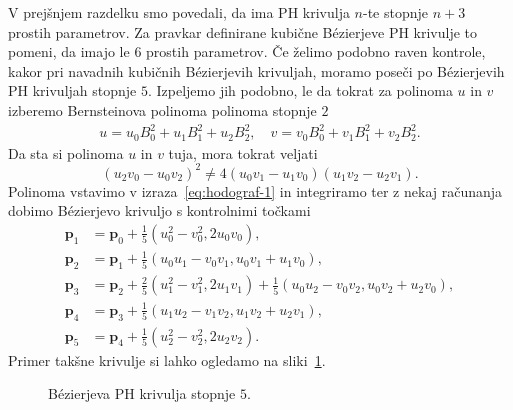 \documentclass[isrm2, tisk]{fmfdelo}
\newcommand{\p}{\mathbf{p}}
\begin{document}
    V prejšnjem razdelku smo povedali, da ima PH krivulja $n$-te stopnje $n+3$ prostih parametrov.
    Za pravkar definirane kubične Bézierjeve PH krivulje to pomeni, da imajo le $6$ prostih parametrov.
    Če želimo podobno raven kontrole, kakor pri navadnih kubičnih Bézierjevih krivuljah, moramo poseči po Bézierjevih PH krivuljah stopnje $5$.
    Izpeljemo jih podobno, le da tokrat za polinoma $u$ in $v$  izberemo Bernsteinova polinoma polinoma stopnje $2$
    \begin{align}
        \label{eq:ph-bernstein-2}
        u=u_0B_{0}^{2}+u_1B_{1}^{2}+u_2B_{2}^{2}, \quad v=v_0B_{0}^{2}+v_1B_{1}^{2}+v_2B_{2}^{2}.
    \end{align}
    Da sta si polinoma $u$ in $v$ tuja, mora tokrat veljati \[(u_2 v_0 -u_0 v_2)^2 \neq 4(u_0 v_1 - u_1 v_0)(u_1 v_2-u_2v_1).\]
    Polinoma vstavimo v izraza~\eqref{eq:hodograf-1} in integriramo ter z nekaj računanja dobimo Bézierjevo krivuljo s kontrolnimi točkami
    \begin{align}
        \p_1 &=\p_0+\frac{1}{5}(u_0^2-v_0^2,2u_0v_0),  \nonumber\\
        \p_2 &= \p_1+\frac{1}{5}(u_0u_1-v_0v_1, u_0v_1+u_1v_0), \nonumber\\
        \p_3 &= \p_2 + \frac{2}{5}(u_1^2-v_1^2, 2u_1v_1) + \frac{1}{5}(u_0u_2-v_0v_2, u_0v_2+u_2v_0), \label{eq:ph-kontrolne-5}\\
        \p_4 &= \p_3+\frac{1}{5}(u_1u_2-v_1v_2, u_1v_2+u_2v_1), \nonumber\\
        \p_5 &=\p_4+\frac{1}{5}(u_2^2-v_2^2,2u_2v_2). \nonumber
    \end{align}
    Primer takšne krivulje si lahko ogledamo na sliki~\ref{fig:kvinticna-ph}.
    \begin{figure}[h]
        \centering
        \caption{Bézierjeva PH krivulja stopnje $5$.}\label{fig:kvinticna-ph}
    \end{figure}
\end{document}
